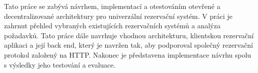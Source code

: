 \begin{sloppypar}
Tato práce se zabývá návrhem, implementací a otestováním otevřené a decentralizované architektury pro univerzální rezervační systém. V práci je zahrnut přehled vybraných existujících rezervačních systémů a analýza požadavků. Tato práce dále navrhuje vhodnou architekturu, klientskou rezervační aplikaci a její back end, který je navržen tak, aby podporoval společný rezervační protokol založený na HTTP. Nakonec je představena implementace návrhu spolu s výsledky jeho testování a evaluace.
\end{sloppypar}
